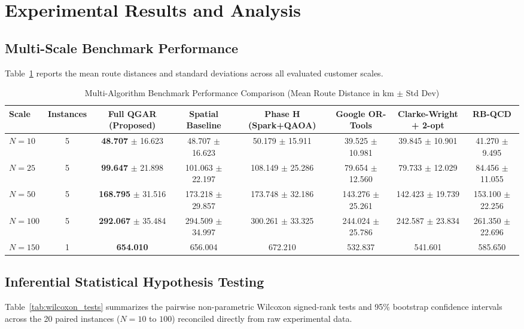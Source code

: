 \documentclass[journal,10pt]{IEEEtran}
\begin{document}
\section{Experimental Results and Analysis}

\subsection{Multi-Scale Benchmark Performance}
Table~\ref{tab:benchmark_results} reports the mean route distances and standard deviations across all evaluated customer scales.

\begin{table}[t]
\caption{Multi-Algorithm Benchmark Performance Comparison (Mean Route Distance in km $\pm$ Std Dev)}
\label{tab:benchmark_results}
\centering
\begin{tabular}{lccccccc}
\toprule
\textbf{Scale} & \textbf{Instances} & \textbf{Full QGAR (Proposed)} & \textbf{Spatial Baseline} & \textbf{Phase H (Spark+QAOA)} & \textbf{Google OR-Tools} & \textbf{Clarke-Wright + 2-opt} & \textbf{RB-QCD} \\
\midrule
$N=10$  & 5 & \textbf{48.707} $\pm$ 16.623 & 48.707 $\pm$ 16.623 & 50.179 $\pm$ 15.911 & 39.525 $\pm$ 10.981 & 39.845 $\pm$ 10.901 & 41.270 $\pm$ 9.495 \\
$N=25$  & 5 & \textbf{99.647} $\pm$ 21.898 & 101.063 $\pm$ 22.197 & 108.149 $\pm$ 25.286 & 79.654 $\pm$ 12.560 & 79.733 $\pm$ 12.029 & 84.456 $\pm$ 11.055 \\
$N=50$  & 5 & \textbf{168.795} $\pm$ 31.516 & 173.218 $\pm$ 29.857 & 173.748 $\pm$ 32.186 & 143.276 $\pm$ 25.261 & 142.423 $\pm$ 19.739 & 153.100 $\pm$ 22.256 \\
$N=100$ & 5 & \textbf{292.067} $\pm$ 35.484 & 294.509 $\pm$ 34.997 & 300.261 $\pm$ 33.325 & 244.024 $\pm$ 25.786 & 242.587 $\pm$ 23.834 & 261.350 $\pm$ 22.696 \\
$N=150$ & 1 & \textbf{654.010} & 656.004 & 672.210 & 532.837 & 541.601 & 585.650 \\
\bottomrule
\end{tabular}
\end{table}

\subsection{Inferential Statistical Hypothesis Testing}
Table~\ref{tab:wilcoxon_tests} summarizes the pairwise non-parametric Wilcoxon signed-rank tests and 95\% bootstrap confidence intervals across the 20 paired instances ($N=10$ to $100$) reconciled directly from raw experimental data.
\end{document}
